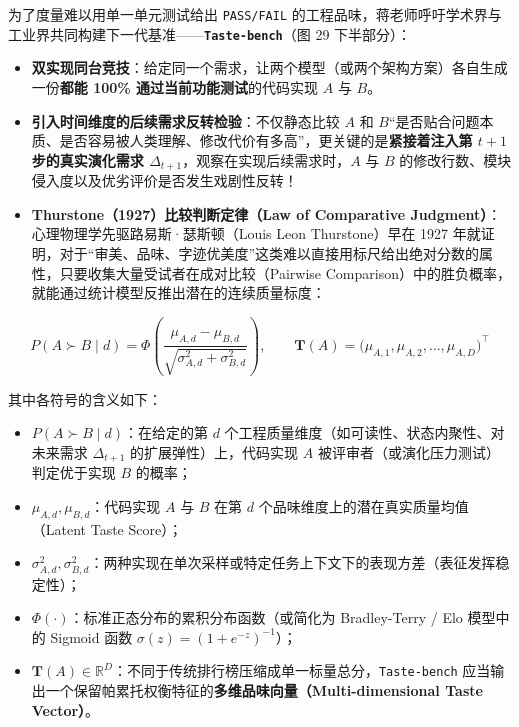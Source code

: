 \documentclass[a4paper]{article}
\begin{document}
为了度量难以用单一单元测试给出 \texttt{PASS/FAIL} 的工程品味，蒋老师呼吁学术界与工业界共同构建下一代基准——\textbf{\texttt{Taste-bench}}（图 29 下半部分）：
\begin{itemize}
    \item \textbf{双实现同台竞技}：给定同一个需求，让两个模型（或两个架构方案）各自生成一份\textbf{都能 100\% 通过当前功能测试}的代码实现 $A$ 与 $B$。
    \item \textbf{引入时间维度的后续需求反转检验}：不仅静态比较 $A$ 和 $B$“是否贴合问题本质、是否容易被人类理解、修改代价有多高”，更关键的是\textbf{紧接着注入第 $t+1$ 步的真实演化需求 $\Delta_{t+1}$}，观察在实现后续需求时，$A$ 与 $B$ 的修改行数、模块侵入度以及优劣评价是否发生戏剧性反转！
    \item \textbf{Thurstone（1927）比较判断定律（Law of Comparative Judgment）}：心理物理学先驱路易斯·瑟斯顿（Louis Leon Thurstone）早在 1927 年就证明，对于“审美、品味、字迹优美度”这类难以直接用标尺给出绝对分数的属性，只要收集大量受试者在成对比较（Pairwise Comparison）中的胜负概率，就能通过统计模型反推出潜在的连续质量标度：
\end{itemize}

\begin{equation}
P(A \succ B \mid d) = \Phi\!\left(\frac{\mu_{A,d} - \mu_{B,d}}{\sqrt{\sigma_{A,d}^2 + \sigma_{B,d}^2}}\right), \qquad
\mathbf{T}(A) = \bigl(\mu_{A,1}, \mu_{A,2}, \dots, \mu_{A,D}\bigr)^{\top}
\end{equation}

其中各符号的含义如下：
\begin{itemize}
    \item $P(A \succ B \mid d)$：在给定的第 $d$ 个工程质量维度（如可读性、状态内聚性、对未来需求 $\Delta_{t+1}$ 的扩展弹性）上，代码实现 $A$ 被评审者（或演化压力测试）判定优于实现 $B$ 的概率；
    \item $\mu_{A,d}, \mu_{B,d}$：代码实现 $A$ 与 $B$ 在第 $d$ 个品味维度上的潜在真实质量均值（Latent Taste Score）；
    \item $\sigma_{A,d}^2, \sigma_{B,d}^2$：两种实现在单次采样或特定任务上下文下的表现方差（表征发挥稳定性）；
    \item $\Phi(\cdot)$：标准正态分布的累积分布函数（或简化为 Bradley-Terry / Elo 模型中的 Sigmoid 函数 $\sigma(z) = (1 + e^{-z})^{-1}$）；
    \item $\mathbf{T}(A) \in \mathbb{R}^D$：不同于传统排行榜压缩成单一标量总分，\texttt{Taste-bench} 应当输出一个保留帕累托权衡特征的\textbf{多维品味向量（Multi-dimensional Taste Vector）}。
\end{itemize}
\end{document}
